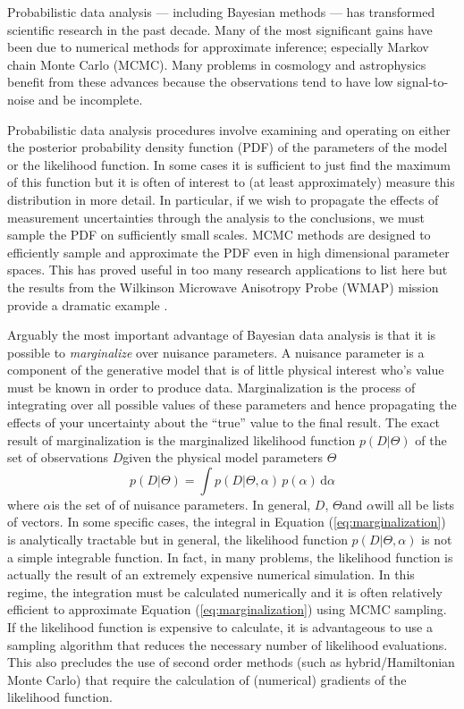 \documentclass[12pt,preprint]{aastex}
\newcommand{\eq}[1]{Equation (\ref{eq:#1})}
\newcommand{\eqlabel}[1]{\label{eq:#1}}
\newcommand{\dd}{\mathrm{d}}
\renewcommand{\vector}[1]{#1}
\newcommand{\pr}[1]{\ensuremath{p(#1)}}
\newcommand{\model}{\ensuremath{\vector{\Theta}}}
\newcommand{\data}{\ensuremath{\vector{D}}}
\newcommand{\nuisance}{\ensuremath{\vector{\alpha}}}
\begin{document}
Probabilistic data analysis --- including Bayesian methods --- has
transformed scientific research in the past decade. Many of the most
significant gains have been due to numerical methods for approximate
inference; especially Markov chain Monte Carlo (MCMC). Many
problems in cosmology and astrophysics benefit from these advances because
the observations tend to have low signal-to-noise and be incomplete.

Probabilistic data analysis procedures involve examining and operating on
either the posterior probability density function (PDF) of the parameters
of the model or the likelihood function. In some cases it is
sufficient to just find the maximum of this function but it is often of
interest to (at least approximately) measure this distribution in more detail.
In particular, if we wish to propagate the effects of measurement
uncertainties through the analysis to the conclusions, we must sample the
PDF on sufficiently small scales. MCMC methods are designed to efficiently
sample and approximate the PDF even in high dimensional
parameter spaces. This has proved useful in too many research
applications to list here but the results from the Wilkinson Microwave
Anisotropy Probe (WMAP) mission provide a dramatic example
\citep[e.g.][]{Dunkley:2005}.

Arguably the most important advantage of Bayesian data analysis is
that it is possible to \emph{marginalize} over nuisance parameters. A
nuisance parameter is a component of the generative model that is of little
physical interest who's value must be known in order to produce data.
Marginalization is the process of integrating over all possible values of
these parameters and hence propagating the effects of your uncertainty about
the ``true'' value to the final result. The exact result of marginalization
is the marginalized likelihood function \pr{\data|\model}
of the set of observations \data given the physical model parameters
\model
\begin{equation}
    \eqlabel{marginalization}
    \pr{\data | \model} = \int
        \pr{\data | \model, \nuisance} \,
        \pr{\nuisance} \, \dd  \nuisance
\end{equation}
where \nuisance is the set of of nuisance parameters. In general, \data,
\model and \nuisance will all be lists of vectors. In some specific
cases, the integral in \eq{marginalization} is analytically tractable but in
general, the likelihood function
$p (\data | \model, \nuisance)$ is not a simple
integrable function. In fact, in many problems, the likelihood
function is actually the result of an extremely expensive numerical
simulation. In this regime, the integration must be calculated numerically
and it is often relatively efficient to approximate \eq{marginalization}
using MCMC sampling. If the likelihood function is expensive to
calculate, it is advantageous to use a sampling algorithm that reduces the
necessary number of likelihood evaluations. This also precludes the use of
second order methods (such as hybrid/Hamiltonian Monte Carlo) that require
the calculation of (numerical) gradients of the likelihood function.
\end{document}

